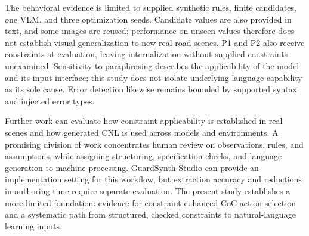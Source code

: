 \documentclass[11pt,a4paper]{article}
\begin{document}
The behavioral evidence is limited to supplied synthetic rules, finite candidates, one VLM, and three optimization seeds. Candidate values are also provided in text, and some images are reused; performance on unseen values therefore does not establish visual generalization to new real-road scenes. P1 and P2 also receive constraints at evaluation, leaving internalization without supplied constraints unexamined. Sensitivity to paraphrasing describes the applicability of the model and its input interface; this study does not isolate underlying language capability as its sole cause. Error detection likewise remains bounded by supported syntax and injected error types.\par

Further work can evaluate how constraint applicability is established in real scenes and how generated CNL is used across models and environments. A promising division of work concentrates human review on observations, rules, and assumptions, while assigning structuring, specification checks, and language generation to machine processing. GuardSynth Studio can provide an implementation setting for this workflow, but extraction accuracy and reductions in authoring time require separate evaluation. The present study establishes a more limited foundation: evidence for constraint-enhanced CoC action selection and a systematic path from structured, checked constraints to natural-language learning inputs.\par
\end{document}
